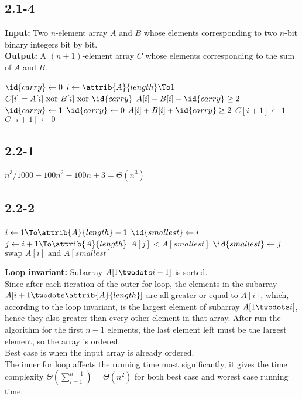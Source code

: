 \documentclass[a4paper, 11pt]{report}
\begin{document}
				\subsection{2.1-4}
					\textbf{Input:} Two $n$-element array $A$ and $B$ whose elements corresponding to two $n$-bit
					binary integers bit by bit.	\\ 
					\textbf{Output:} A $(n+1)$-element array $C$ whose elements corresponding to the sum of
					$A$ and $B$.
					\begin{codebox}
						\li	$\id{carry} \gets 0$
						\li	\For $i \gets \attrib{A}{length} \To 1$
							\Do
						\li		$C[i] = A[i] \mbox{ xor } B[i] \mbox{ xor } \id{carry}$
						\li		\If $A[i]+B[i]+\id{carry}\ge2$		
								\Then
						\li			$\id{carry} \gets 1$
						\li		\Else
						\li			$\id{carry} \gets 0$		
								\End
							\End
						\li	\If $A[i]+B[i]+\id{carry}\ge2$
							\Then
						\li		$C[i+1] \gets 1$
						\li	\Else
						\li		$C[i+1] \gets 0$
							\End
					\end{codebox}
				\subsection{2.2-1}
					$n^3/1000-100n^2-100n+3=\Theta(n^3)$
				\subsection{2.2-2}
					\begin{codebox}
						\Procname{$\proc{Selection-Sort}(A)$}
						\li	\For $i \gets 1 \To \attrib{A}{length}-1$
							\Do
						\li		$\id{smallest} \gets i$
						\li		\For $j \gets i+1 \To \attrib{A}{length}$
								\Do
						\li			\If $A[j] < A[smallest]$
									\Then
						\li				$\id{smallest} \gets j$
									\End
								\End
						\li		$\mbox{swap } A[i] \mbox{ and } A[smallest]$
							\End
					\end{codebox}
					\textbf{Loop invariant:} Subarray $A[1 \twodots i-1]$ is sorted.\\
					Since after each iteration of the outer for loop, the elements in the subarray $A[i+1 \twodots \attrib{A}{length}]$
					are all greater or equal to $A[i]$, which, according to the loop invariant, is the largest element of subarray
					$A[1 \twodots i]$, hence they also greater than every other element in that array. After run the algorithm for 
					the first $n-1$ elements, the last element left must be the largest element, so the array is ordered.	\\
					Best case is when the input array is already ordered.	\\
					The inner for loop affects the running time most significantly, it gives the time complexity $\Theta(\sum_{i=1}^{n-1})=\Theta(n^2)$
					for both best case and worest case running time.
\end{document}
